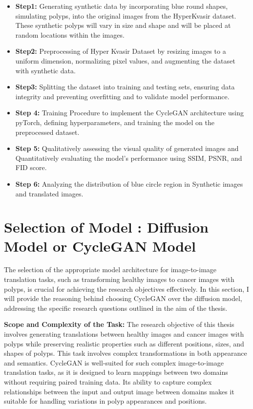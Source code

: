 \documentclass[UKenglish,12pt]{master-style}
\begin{document}
\begin{itemize}

\item \textbf{Step1:} Generating synthetic data by incorporating blue round shapes, simulating polyps, into the original images from the HyperKvasir dataset. These synthetic polyps will vary in size and shape and will be placed at random locations within the images.

\item \textbf{Step2:} Preprocessing of Hyper Kvasir Dataset by resizing images to a uniform dimension, normalizing pixel values, and augmenting the dataset with synthetic data.

\item \textbf{Step3: }Splitting the dataset into training and testing sets, ensuring data integrity and preventing overfitting and to validate model performance.

\item \textbf{Step 4: }Training Procedure to implement the CycleGAN architecture using pyTorch, defining hyperparameters, and training the model on the preprocessed dataset.

\item \textbf{Step 5: }Qualitatively assessing the visual quality of generated images and Quantitatively evaluating the model's performance using SSIM, PSNR, and FID score.

\item \textbf{Step 6: }Analyzing the distribution of blue circle region in Synthetic images and translated images.
\end{itemize}

\section{Selection of Model : Diffusion Model or CycleGAN Model}

The selection of the appropriate model architecture for image-to-image translation tasks, such as transforming healthy images to cancer images with polyps, is crucial for achieving the research objectives effectively. In this section, I will provide the reasoning behind choosing CycleGAN over the diffusion model, addressing the specific research questions outlined in the aim of the thesis.

\textbf{Scope and Complexity of the Task:}
The research objective of this thesis involves generating translations between healthy images and cancer images with polyps while preserving realistic properties such as different positions, sizes, and shapes of polyps. This task involves complex transformations in both appearance and semantics.
CycleGAN is well-suited for such complex image-to-image translation tasks, as it is designed to learn mappings between two domains without requiring paired training data. Its ability to capture  complex relationships between the input and output image between domains makes it suitable for handling variations in polyp appearances and positions.
\end{document}
